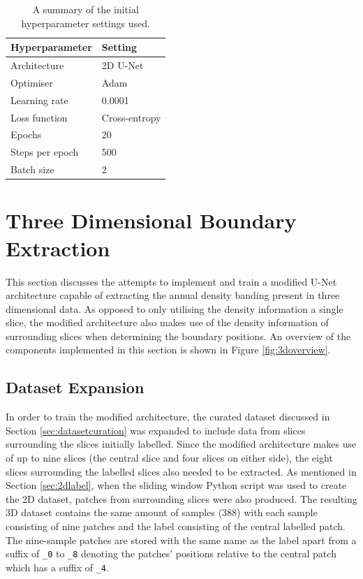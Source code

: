 \begin{table}[t]
    \centering
    \caption{A summary of the initial hyperparameter settings used.}
    \begin{tabular}{@{}ll@{}}
    \toprule
    Hyperparameter   & Setting      \\ \midrule
    Architecture     & 2D U-Net   \\
    Optimiser & Adam \\
    Learning rate & 0.0001 \\
    Loss function & Cross-entropy \\
    Epochs & 20 \\
    Steps per epoch & 500 \\
    Batch size & 2 \\ \bottomrule
    \end{tabular}
    \label{tab:initialhyperparams}
\end{table}

\section{Three Dimensional Boundary Extraction}
\label{sec:threedimension}

This section discusses the attempts to implement and train a modified U-Net architecture capable of extracting the annual density banding present in three dimensional data. As opposed to only utilising the density information a single slice, the modified architecture also makes use of the density information of surrounding slices when determining the boundary positions. An overview of the components implemented in this section is shown in Figure \ref{fig:3doverview}.

\subsection{Dataset Expansion}

In order to train the modified architecture, the curated dataset discussed in Section \ref{sec:datasetcuration} was expanded to include data from slices surrounding the slices initially labelled. Since the modified architecture makes use of up to nine slices (the central slice and four slices on either side), the eight slices surrounding the labelled slices also needed to be extracted. As mentioned in Section \ref{sec:2dlabel}, when the sliding window Python script was used to create the 2D dataset, patches from surrounding slices were also produced. The resulting 3D dataset contains the same amount of samples (388) with each sample consisting of nine patches and the label consisting of the central labelled patch. The nine-sample patches are stored with the same name as the label apart from a suffix of \texttt{\_0} to \texttt{\_8} denoting the patches' positions relative to the central patch which has a suffix of \texttt{\_4}.

